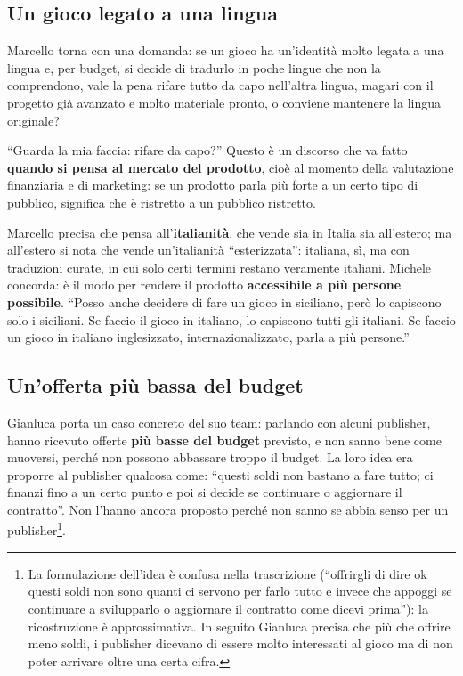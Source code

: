 \subsection{Un gioco legato a una lingua}

Marcello torna con una domanda: se un gioco ha un'identità molto legata a una
lingua e, per budget, si decide di tradurlo in poche lingue che non la
comprendono, vale la pena rifare tutto da capo nell'altra lingua, magari con il
progetto già avanzato e molto materiale pronto, o conviene mantenere la lingua
originale?

``Guarda la mia faccia: rifare da capo?'' Questo è un discorso che va fatto
\textbf{quando si pensa al mercato del prodotto}, cioè al momento della
valutazione finanziaria e di marketing: se un prodotto parla più forte a un
certo tipo di pubblico, significa che è ristretto a un pubblico ristretto.

Marcello precisa che pensa all'\textbf{italianità}, che vende sia in Italia sia
all'estero; ma all'estero si nota che vende un'italianità ``esterizzata'':
italiana, sì, ma con traduzioni curate, in cui solo certi termini restano
veramente italiani. Michele concorda: è il modo per rendere il prodotto
\textbf{accessibile a più persone possibile}. ``Posso anche decidere di fare un
gioco in siciliano, però lo capiscono solo i siciliani. Se faccio il gioco in
italiano, lo capiscono tutti gli italiani. Se faccio un gioco in italiano
inglesizzato, internazionalizzato, parla a più persone.''

\subsection{Un'offerta più bassa del budget}
\label{sec:z4-qa-gianluca}

Gianluca porta un caso concreto del suo team: parlando con alcuni publisher,
hanno ricevuto offerte \textbf{più basse del budget} previsto, e non sanno bene
come muoversi, perché non possono abbassare troppo il budget. La loro idea era
proporre al publisher qualcosa come: ``questi soldi non bastano a fare tutto;
ci finanzi fino a un certo punto e poi si decide se continuare o aggiornare il
contratto''. Non l'hanno ancora proposto perché non sanno se abbia senso per
un publisher\footnote{La formulazione dell'idea è confusa nella trascrizione
(``offrirgli di dire ok questi soldi non sono quanti ci servono per farlo tutto
e invece che appoggi se continuare a svilupparlo o aggiornare il contratto come
dicevi prima''): la ricostruzione è approssimativa. In seguito Gianluca precisa
che più che offrire meno soldi, i publisher dicevano di essere molto interessati
al gioco ma di non poter arrivare oltre una certa cifra.}.

